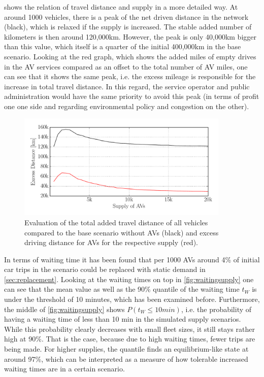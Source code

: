  shows the relation of travel distance and supply in
a more detailed way. At around 1000 vehicles, there is a peak of the net driven
distance in the network (black), which is relaxed if the supply is increased. The
stable added number of kilometers is then around 120,000km. However, the peak is
only 40,000km bigger than this value, which itself is a quarter of the initial
400,000km in the base scenario. Looking at the red graph, which shows the added
miles of empty drives in the AV services compared as an offset to the total number
of AV miles, one can see that it shows the same peak, i.e. the excess mileage is
responsible for the increase in total travel distance. In this regard, the service
operator and public administration would have the same priority to avoid this peak
(in terms of profit one one side and regarding environmental policy and congestion on the other).

\begin{figure}
    \centering
    \includegraphics[width=0.9\textwidth]{figures/excessdistance.pdf}
    \caption{Evaluation of the total added travel distance of all vehicles compared
    to the base scenario without AVs (black) and excess driving distance for AVs
    for the respective supply (red).}
    \label{fig:excessdistance}
\end{figure}

In terms of waiting time it has been found that per 1000 AVs around 4\% of
initial car trips in the scenario could be replaced with static demand in \cref{sec:replacement}.
Looking at the waiting times on top in \cref{fig:waitingsupply}
one can see that the mean value as well as the 90\% quantile of the waiting time
$t_W$ is under the threshold of 10 minutes, which has been examined before. Furthermore, the middle of
\cref{fig:waitingsupply} shows $P(t_W \leq 10 min)$, i.e. the probability of having
a waiting time of less than 10 min in the simulated supply scenarios. While this
probability clearly decreases with small fleet sizes, it still stays rather high
at 90\%. That is the case, because due to high waiting times, fewer trips are being
made. For higher supplies, the quantile finds an equilibrium-like state at around
97\%, which can be interpreted as a measure of how tolerable increased waiting times are
in a certain scenario.

